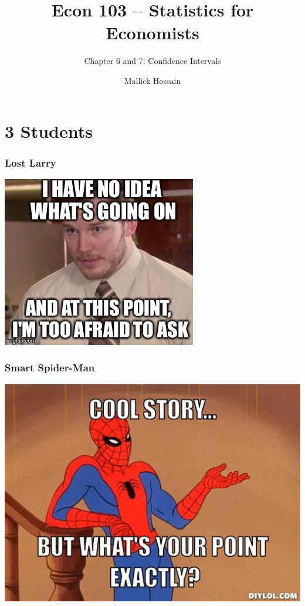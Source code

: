 \documentclass{beamer}
\title{Econ 103 -- Statistics for Economists}
\subtitle{Chapter 6 and 7: Confidence Intervals}
\author{Mallick Hossain}
\date{}
\institute{University of Pennsylvania}
\begin{document}
 

\begin{frame}
	\titlepage 
\end{frame} 

\section{3 Students}
\begin{frame}
\frametitle{Lost Larry}
\centering
\includegraphics[scale=0.7]{./images/whatsthepoint1.jpeg}
\end{frame}

\begin{frame}
\frametitle{Smart Spider-Man}
\centering
\includegraphics[scale=0.5]{./images/whatsthepoint2.jpg}
\end{frame}
\end{document}
